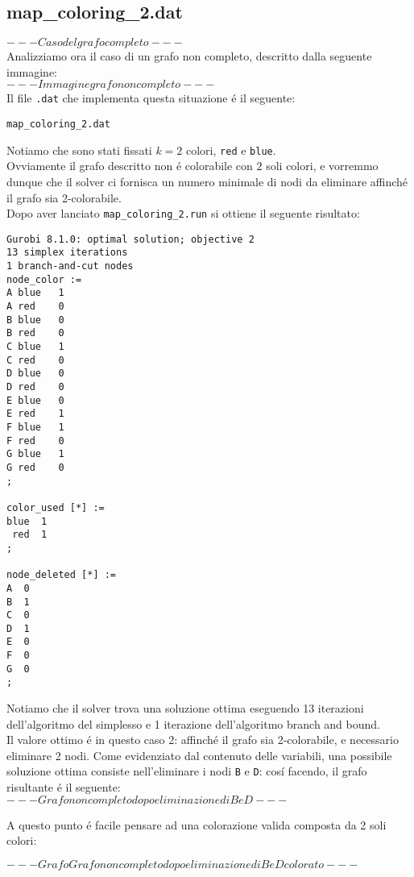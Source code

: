 \documentclass{article}
\begin{document}
\subsection{map\_coloring\_2.dat}
$ --- Caso del grafo completo --- $\\

Analizziamo ora il caso di un grafo non completo, descritto dalla seguente immagine:\\

$ --- Immagine grafo non completo --- $\\

Il file \texttt{.dat} che implementa questa situazione \'e il seguente:

\texttt{map\_coloring\_2.dat}


Notiamo che sono stati fissati $k = 2$ colori, \texttt{red} e \texttt{blue}.\\
Ovviamente il grafo descritto non \'e colorabile con $2$ soli colori, e vorremmo dunque che il solver ci fornisca un numero minimale di nodi da eliminare affinch\'e il grafo sia 2-colorabile.\\

Dopo aver lanciato \texttt{map\_coloring\_2.run} si ottiene il seguente risultato:\\

\begin{verbatim}
Gurobi 8.1.0: optimal solution; objective 2
13 simplex iterations
1 branch-and-cut nodes
node_color :=
A blue   1
A red    0
B blue   0
B red    0
C blue   1
C red    0
D blue   0
D red    0
E blue   0
E red    1
F blue   1
F red    0
G blue   1
G red    0
;

color_used [*] :=
blue  1
 red  1
;

node_deleted [*] :=
A  0
B  1
C  0
D  1
E  0
F  0
G  0
;

\end{verbatim}

Notiamo che il solver trova una soluzione ottima eseguendo 13 iterazioni dell'algoritmo del simplesso e 1 iterazione dell'algoritmo branch and bound.\\
Il valore ottimo \'e in questo caso 2: affinch\'e il grafo sia 2-colorabile, e necessario eliminare 2 nodi. Come evidenziato dal contenuto delle variabili, una possibile soluzione ottima consiste nell'eliminare i nodi \texttt{B} e \texttt{D}: cos\'i facendo, il grafo risultante \'e il seguente:\\

$ --- Grafo non completo dopo eliminazione di B e D --- $

A questo punto \'e facile pensare ad una colorazione valida composta da 2 soli colori:

$ --- Grafo Grafo non completo dopo eliminazione di B e D colorato --- $

\pagebreak
\end{document}
